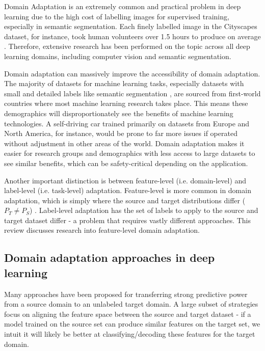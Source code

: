 \documentclass[a4paper,12pt]{report}
\begin{document}
    Domain Adaptation is an extremely common and practical problem in deep learning due to the high cost of labelling images for supervised training, especially in semantic segmentation. Each finely labelled image in the Cityscapes dataset, for instance, took human volunteers over 1.5 hours to produce on average \cite{cordts_cityscapes_2016}. Therefore, extensive research has been performed on the topic across all deep learning domains, including computer vision and semantic segmentation.
    
    Domain adaptation can massively improve the accessibility of domain adaptation. The majority of datasets for machine learning tasks, especially datasets with small and detailed labels like semantic segmentation \cite{cordts_cityscapes_2016} \cite{chen_semantic_2016} \cite{geiger_vision_2013}, are sourced from first-world countries where most machine learning research takes place. This means these demographics will disproportionately see the benefits of machine learning technologies. A self-driving car trained primarily on datasets from Europe and North America, for instance, would be prone to far more issues if operated without adjustment in other areas of the world. Domain adaptation makes it easier for research groups and demographics with less access to large datasets to see similar benefits, which can be safety-critical depending on the application.
    
    Another important distinction is between feature-level (i.e. domain-level) and label-level (i.e. task-level) adaptation. Feature-level is more common in domain adaptation, which is simply where the source and target distributions differ ($P_T \neq P_S$) \cite{wilson_survey_2020}. Label-level adaptation has the set of labels to apply to the source and target dataset differ - a problem that requires vastly different approaches. This review discusses research into feature-level domain adaptation.
    
    \subsection{Domain adaptation approaches in deep learning}
    
    Many approaches have been proposed for transferring strong predictive power from a source domain to an unlabeled target domain. A large subset of strategies focus on aligning the feature space between the source and target dataset - if a model trained on the source set can produce similar features on the target set, we intuit it will likely be better at classifying/decoding these features for the target domain.
    
\end{document}
